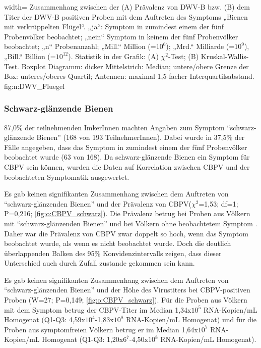  
  {width=\textwidth} %
  {Zusammenhang zwischen der (A) Prävalenz von DWV-B bzw. (B) dem Titer der DWV-B positiven Proben mit dem Auftreten des Symptoms „Bienen mit verkrüppelten Flügel“. „ja“: Symptom in zumindest einem der fünf Probenvölker beobachtet; „nein“ Symptom in keinem der fünf Probenvölker beobachtet; „n“ Probenanzahl; „Mill.“ Million (=$10^6$); „Mrd.“ Milliarde (=$10^9$), „Bill.“ Billion (=$10^{12}$). Statistik in der Grafik: (A) $\chi^2$-Test; (B) Kruskal-Wallis-Test. Boxplot Diagramm: dicker Mittelstrich: Median; untere/obere Grenze der Box: unteres/oberes Quartil; Antennen: maximal 1,5-facher Interquartilsabstand.} %
  {} %
  {fig:n:DWV_Fluegel} %

\subsubsection{Schwarz-glänzende Bienen}

87,0\% der teilnehmenden ImkerInnen machten Angaben zum Symptom \enquote{schwarz-glänzende Bienen} (168 von 193 TeilnehmerInnen). Dabei wurde in 37,5\% der Fälle angegeben, dass das Symptom in zumindest einem der fünf Probenvölker beobachtet wurde (63 von 168). Da schwarz-glänzende Bienen ein Symptom für CBPV sein können, wurden die Daten auf Korrelation zwischen CBPV und der beobachteten Symptomatik ausgewertet.
 
 Es gab keinen signifikanten Zusammenhang zwischen dem Auftreten von \enquote{schwarz-glänzenden Bienen} und der Prävalenz von CBPV($\chi^2$=1,53; df=1; P=0,216; \cref{fig:o:CBPV_schwarz}). Die Prävalenz betrug bei Proben aus Völkern mit \enquote{schwarz-glänzenden Bienen}  und bei Völkern ohne beobachtetem Symptom . Daher war die Prävalenz von CBPV zwar doppelt so hoch, wenn das Symptom beobachtet wurde, als wenn es nicht beobachtet wurde. Doch die deutlich überlappenden Balken des 95\% Konvidenzintervalls zeigen, dass dieser Unterschied auch durch Zufall zustande gekommen sein kann.
 
 Es gab keinen signifikanten Zusammenhang zwischen dem Auftreten von \enquote{schwarz-glänzenden Bienen} und der Höhe des Virustiters bei CBPV-positiven Proben (W=27; P=0,149; \cref{fig:o:CBPV_schwarz}). Für die Proben aus Völkern mit dem Symptom betrug der CBPV-Titer im Median 1,34x$10^5$ RNA-Kopien/\si{\milli\liter} Homogenat (Q1-Q3: 4,59x$10^4$-1,83x$10^8$ RNA-Kopien/\si{\milli\liter} Homogenat) und für die Proben aus symptomfreien Völkern betrug er im Median 1,64x$10^7$ RNA-Kopien/\si{\milli\liter} Homogenat (Q1-Q3: 1,20x$6^7$-4,50x$10^8$ RNA-Kopien/\si{\milli\liter} Homogenat).
 
